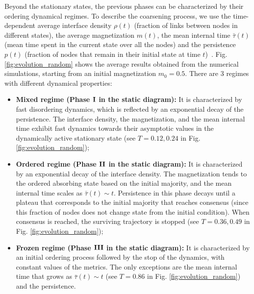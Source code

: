 Beyond the stationary states, the previous phases can be characterized by their ordering dynamical regimes. To describe the coarsening process, we use the time-dependent average interface density $\rho(t)$ (fraction of links between nodes in different states), the average magnetization $m(t)$, the mean internal time $\bar{\tau}(t)$ (mean time spent in the current state over all the nodes) and the persistence $p(t)$ (fraction of nodes that remain in their initial state at time $t$)~\cite{ben-naim-1996}. Fig. \ref{fig:evolution_random} shows the average results obtained from the numerical simulations, starting from an initial magnetization $m_0 = 0.5$. There are 3 regimes with different dynamical properties:

\begin{itemize}
	\item \textbf{Mixed regime (Phase ${\rm {\bf I}}$ in the static diagram):} It is characterized by fast disordering dynamics, which is reflected by an exponential decay of the persistence. The interface density, the magnetization, and the mean internal time exhibit fast dynamics towards their asymptotic values in the dynamically active stationary state (see $T = 0.12, 0.24$ in Fig. \ref{fig:evolution_random});
	\item \textbf{Ordered regime (Phase ${\rm {\bf II}}$ in the static diagram):} It is characterized by an exponential decay of the interface density. The magnetization tends to the ordered absorbing state based on the initial majority, and the mean internal time scales as $\bar{\tau}(t) \sim t$. Persistence in this phase decays until a plateau that corresponds to the initial majority that reaches consensus (since this fraction of nodes does not change state from the initial condition). When consensus is reached, the surviving trajectory is stopped (see $T = 0.36, 0.49$ in Fig. \ref{fig:evolution_random});
	\item \textbf{Frozen regime (Phase ${\rm {\bf III}}$ in the static diagram):} It is characterized by an initial ordering process followed by the stop of the dynamics, with constant values of the metrics. The only exceptions are the mean internal time that grows as $\bar{\tau}(t) \sim t$ (see $T = 0.86$ in Fig. \ref{fig:evolution_random}) and the persistence.
\end{itemize}


